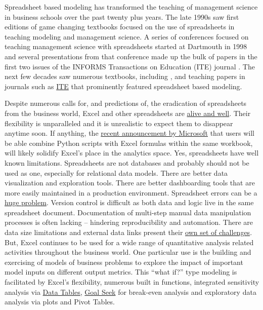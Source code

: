 \documentclass[ited,blindrev]{informs3}              %
\begin{document}
Spreadsheet based modeling has transformed the teaching of management science in business schools over the past twenty plus years. The late 1990s saw first editions of game changing textbooks \citep{winstonPracticalManagementScience2018,ragsdaleSpreadsheetModelingDecision2017} focused on the use of spreadsheets in teaching modeling and management science.  A series of conferences focused on teaching management science with spreadsheets started at Dartmouth in 1998 and several presentations from that conference made up the bulk of papers in the first two issues of the INFORMS Transactions on Education (ITE) journal \citep{baker2000:lp,bell2000:statistics,evans2000:simulation,carraway2000:mba,ragsdale2001:teaching,savage2001:blitzograms}. The next few decades saw numerous textbooks, including {\citet{powellBusinessAnalyticsArt2019, camm2020business}}, and teaching papers in journals such as \href{https://pubsonline.informs.org/journal/ited}{ITE} that prominently featured spreadsheet based modeling.

Despite numerous calls for, and predictions of, the eradication of spreadsheets from the business world, Excel and other spreadsheets are \href{https://benn.substack.com/p/the-next-billion-programmers}{alive and well}. Their flexibility is unparalleled and it is unrealistic to expect them to disappear anytime soon. If anything, the \href{https://techcommunity.microsoft.com/t5/excel-blog/announcing-python-in-excel-combining-the-power-of-python-and-the/ba-p/3893439}{recent announcement by Microsoft} that users will be able combine Python scripts with Excel formulas within the same workbook, will likely solidify Excel's place in the analytics space. Yes, spreadsheets have well known limitations. Spreadsheets are not databases and probably should not be used as one, especially for relational data models. There are better data visualization and exploration tools. There are better dashboarding tools that are more easily maintained in a production environment. Spreadsheet errors can be a \href{https://eusprig.org/research-info/horror-stories/}{huge problem}. Version control is difficult as both data and logic live in the same spreadsheet document. Documentation of multi-step manual data manipulation processes is often lacking -- hindering reproducibility and automation. There are data size limitations and external data links present their \href{https://www.thespreadsheetguru.com/find-remove-external-links/}{own set of challenges}. But, Excel continues to be used for a wide range of quantitative analysis related activities throughout the business world. One particular use is the building and exercising of models of business problems
to explore the impact of important model inputs on different output metrics. This ``what if?'' type modeling is facilitated by Excel's flexibility, numerous built in functions, integrated sensitivity analysis via \href{https://support.microsoft.com/en-us/office/calculate-multiple-results-by-using-a-data-table-e95e2487-6ca6-4413-ad12-77542a5ea50b}{Data Tables},  \href{https://support.microsoft.com/en-us/office/use-goal-seek-to-find-the-result-you-want-by-adjusting-an-input-value-320cb99e-f4a4-417f-b1c3-4f369d6e66c7}{Goal
	Seek} for break-even analysis and exploratory data analysis via plots and Pivot Tables. 
\end{document}
